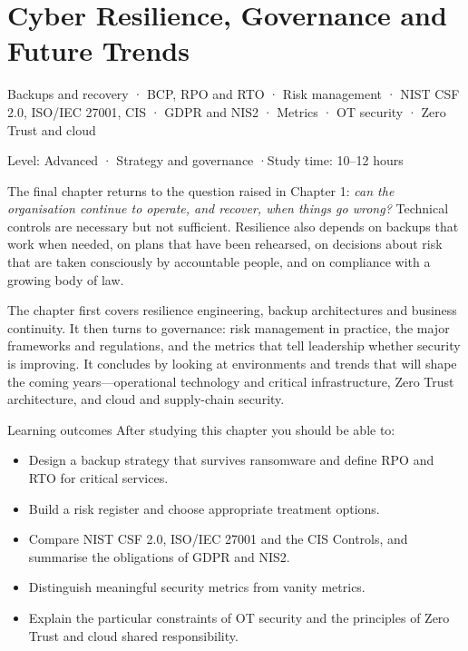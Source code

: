 \documentclass[11pt,openany]{book}
\newcommand{\chaptermeta}[3]{%
  {\sffamily\small\color{accent}#1\par}\vspace{0.3em}
  {\sffamily\footnotesize\color{gray}#2 \quad·\quad #3\par}\vspace{1.2em}}
\begin{document}
\chapter{Cyber Resilience, Governance and Future Trends}\label{ch:13}
\chaptermeta{Backups and recovery · BCP, RPO and RTO · Risk management · NIST CSF 2.0, ISO/IEC 27001, CIS · GDPR and NIS2 · Metrics · OT security · Zero Trust and cloud}{Level: Advanced · Strategy and governance}{Study time: 10–12 hours}

The final chapter returns to the question raised in Chapter 1: \emph{can the organisation continue to operate, and recover, when things go wrong?} Technical controls are necessary but not sufficient. Resilience also depends on backups that work when needed, on plans that have been rehearsed, on decisions about risk that are taken consciously by accountable people, and on compliance with a growing body of law.

The chapter first covers resilience engineering, backup architectures and business continuity. It then turns to governance: risk management in practice, the major frameworks and regulations, and the metrics that tell leadership whether security is improving. It concludes by looking at environments and trends that will shape the coming years—operational technology and critical infrastructure, Zero Trust architecture, and cloud and supply-chain security.

\begin{outcomesbox}{Learning outcomes}
After studying this chapter you should be able to:
\begin{itemize}
  \item Design a backup strategy that survives ransomware and define RPO and RTO for critical services.
  \item Build a risk register and choose appropriate treatment options.
  \item Compare NIST CSF 2.0, ISO/IEC 27001 and the CIS Controls, and summarise the obligations of GDPR and NIS2.
  \item Distinguish meaningful security metrics from vanity metrics.
  \item Explain the particular constraints of OT security and the principles of Zero Trust and cloud shared responsibility.
\end{itemize}
\end{outcomesbox}
\end{document}
